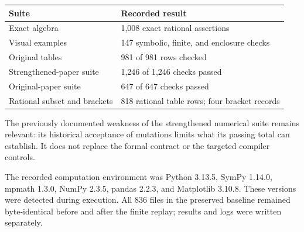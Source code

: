 \begin{longtable}{p{}p{}}
\toprule Suite & Recorded result \\ \midrule\endhead
Exact algebra & 1,008 exact rational assertions \\
Visual examples & 147 symbolic, finite, and enclosure checks \\
Original tables & 981 of 981 rows checked \\
Strengthened-paper suite & 1,246 of 1,246 checks passed \\
Original-paper suite & 647 of 647 checks passed \\
Rational subset and brackets & 818 rational table rows; four bracket records \\
\bottomrule
\end{longtable}
The previously documented weakness of the strengthened numerical suite remains relevant: its historical acceptance of mutations limits what its passing total can establish. It does not replace the formal contract or the targeted compiler controls.

The recorded computation environment was Python 3.13.5, SymPy 1.14.0, mpmath 1.3.0, NumPy 2.3.5, pandas 2.2.3, and Matplotlib 3.10.8. These versions were detected during execution. All 836 files in the preserved baseline remained byte-identical before and after the finite replay; results and logs were written separately.

